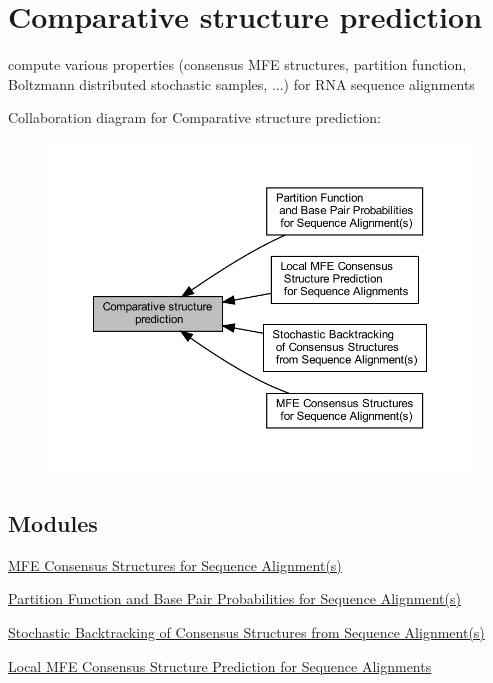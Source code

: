 \hypertarget{group__consensus__fold}{}\section{Comparative structure prediction}
\label{group__consensus__fold}


compute various properties (consensus M\+FE structures, partition function, Boltzmann distributed stochastic samples, ...) for R\+NA sequence alignments  


Collaboration diagram for Comparative structure prediction\+:
\nopagebreak
\begin{figure}[H]
\begin{center}
\leavevmode
\includegraphics[width=350pt]{group__consensus__fold}
\end{center}
\end{figure}
\subsection*{Modules}
\begin{DoxyCompactItemize}
\item 
\hyperlink{group__consensus__mfe__fold}{M\+F\+E Consensus Structures for Sequence Alignment(s)}
\item 
\hyperlink{group__consensus__pf__fold}{Partition Function and Base Pair Probabilities for Sequence Alignment(s)}
\item 
\hyperlink{group__consensus__stochbt}{Stochastic Backtracking of Consensus Structures from Sequence Alignment(s)}
\item 
\hyperlink{group__local__consensus__fold}{Local M\+F\+E Consensus Structure Prediction for Sequence Alignments}
\end{DoxyCompactItemize}
